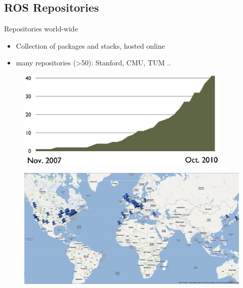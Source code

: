 \lyxframeend{}


\lyxframeend{}\subsection{ROS Repositories}


\lyxframeend{}

Repositories world-wide
\begin{itemize}
\item Collection of packages and stacks, hosted online
\item many repositories (>50): Stanford, CMU, TUM ..
\end{itemize}
\noindent \begin{center}
\begin{figure}[H]
\noindent \centering{}\includegraphics[width=0.9\textwidth]{images/ROSReopGrowth}
\end{figure}

\par\end{center}


\lyxframeend{}


\lyxframeend{}

\noindent \begin{center}
\begin{figure}[H]
\noindent \centering{}\includegraphics[bb=80bp 0bp 1350bp 550bp,width=1\paperwidth]{images/ROS_Repositories}
\end{figure}

\par\end{center}



